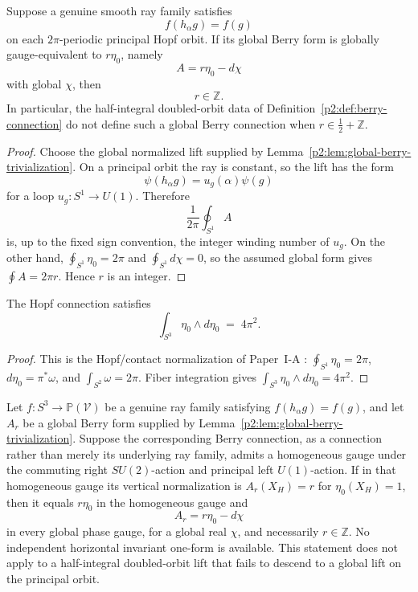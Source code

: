 \documentclass[11pt,a4paper]{article}
\begin{document}
\begin{corollary}
\label{p2:cor:global-berry-weight-integrality}
Suppose a genuine smooth ray family satisfies
\[
        f(h_\alpha g)=f(g)
\]
on each \(2\pi\)-periodic principal Hopf orbit.  If its global Berry form is
globally gauge-equivalent to \(r\eta_0\), namely
\[
        A=r\eta_0-d\chi
\]
with global \(\chi\), then
\[
        r\in\mathbb Z.
\]
In particular, the half-integral doubled-orbit data of
Definition~\ref{p2:def:berry-connection} do not define such a global Berry
connection when \(r\in\frac12+\mathbb Z\).
\end{corollary}

\begin{proof}
Choose the global normalized lift supplied by
Lemma~\ref{p2:lem:global-berry-trivialization}.  On a principal orbit the ray
is constant, so the lift has the form
\[
        \psi(h_\alpha g)=u_g(\alpha)\psi(g)
\]
for a loop \(u_g:S^1\to U(1)\).  Therefore
\[
        \frac1{2\pi}\oint_{S^1}A
\]
is, up to the fixed sign convention, the integer winding number of \(u_g\).
On the other hand,
\(\oint_{S^1}\eta_0=2\pi\) and
\(\oint_{S^1}d\chi=0\), so the assumed global form gives
\(\oint A=2\pi r\).  Hence \(r\) is an integer.
\end{proof}

\begin{lemma}
\label{p2:lem:hopf-normalization}
The Hopf connection satisfies
\begin{equation}
\label{p2:eq:hopf-volume}
\int_{S^3}\eta_0\wedge d\eta_0 \;=\; 4\pi^2.
\end{equation}
\end{lemma}

\begin{proof}
This is the Hopf/contact normalization of Paper~I-A \cite{Kugelmann2026a}: \(\oint_{S^1}\eta_0=2\pi\), \(d\eta_0=\pi^*\omega\), and \(\int_{S^2}\omega=2\pi\).  Fiber integration gives \(\int_{S^3}\eta_0\wedge d\eta_0=4\pi^2\).
\end{proof}

\begin{lemma}
\label{p2:rem:berry-connection-status}
Let \(f:S^3\to\mathbb P(\mathcal V)\) be a genuine ray family satisfying
\(f(h_\alpha g)=f(g)\), and let \(A_r\) be a global Berry form supplied by
Lemma~\ref{p2:lem:global-berry-trivialization}.  Suppose the corresponding
Berry connection, as a connection rather than merely its underlying ray
family, admits a homogeneous gauge under the commuting right
\(SU(2)\)-action and principal left \(U(1)\)-action.  If in that homogeneous
gauge its vertical normalization is \(A_r(X_H)=r\) for
\(\eta_0(X_H)=1\), then it equals \(r\eta_0\) in the homogeneous gauge and
\[
        A_r=r\eta_0-d\chi
\]
in every global phase gauge, for a global real \(\chi\), and necessarily
\(r\in\mathbb Z\).  No independent horizontal invariant one-form is
available.  This statement does not apply to a half-integral doubled-orbit
lift that fails to descend to a global lift on the principal orbit.
\end{lemma}
\end{document}
